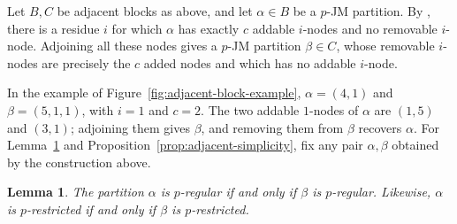 \documentclass[12pt,reqno,a4paper]{amsart}
\numberwithin{equation}{section}
\numberwithin{figure}{section}
\theoremstyle{plain}
\newtheorem{lemma}[theorem]{Lemma}
\theoremstyle{definition}
\begin{document}
Let $B,C$ be adjacent blocks as above, and let $\alpha\in B$ be a
$p$-JM partition.
By \cite[Section~3 and the proof of Lemma~3.2]{Fayers}, there is a
residue $i$ for which $\alpha$ has exactly $c$ addable $i$-nodes and
no removable $i$-node.  Adjoining all these nodes gives a $p$-JM
partition $\beta\in C$, whose removable $i$-nodes are precisely the
$c$ added nodes and which has no addable $i$-node.

In the example of Figure~\ref{fig:adjacent-block-example},
$\alpha=(4,1)$ and $\beta=(5,1,1)$, with $i=1$ and $c=2$.
The two addable $1$-nodes of $\alpha$ are $(1,5)$ and $(3,1)$;
adjoining them gives $\beta$, and removing them from $\beta$
recovers $\alpha$.
For Lemma~\ref{lem:adjacent-regularity} and
Proposition~\ref{prop:adjacent-simplicity}, fix any pair
$\alpha,\beta$ obtained by the construction above.

\begin{lemma}\label{lem:adjacent-regularity}
The partition $\alpha$ is $p$-regular if and only if $\beta$ is
$p$-regular.  Likewise, $\alpha$ is $p$-restricted if and only if
$\beta$ is $p$-restricted.
\end{lemma}
\end{document}
